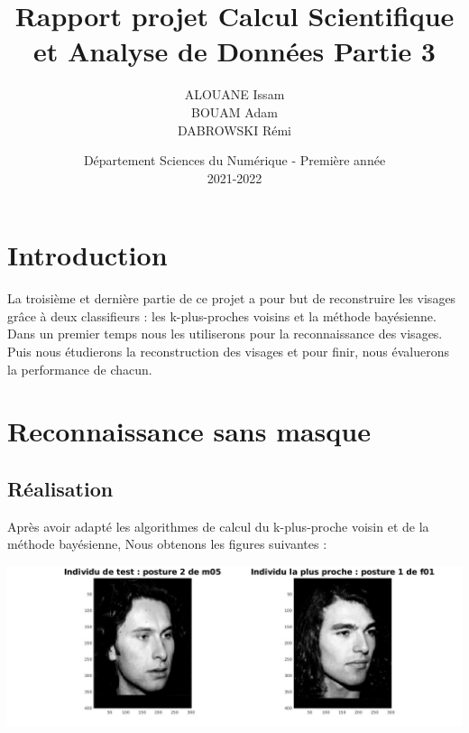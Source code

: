 \documentclass[frenchb]{article}
\begin{document}
	
	\begin{figure}[t]
		\centering
	\end{figure}
	
	\title{\vspace{4cm} \textbf{Rapport projet Calcul Scientifique et Analyse de Données Partie 3}}
	\author{ALOUANE Issam\\ BOUAM Adam\\ DABROWSKI Rémi\\ }
	\date{\vspace{9cm} Département Sciences du Numérique - Première année \\
		2021-2022 }
	
	\maketitle
	
	\newpage
	\tableofcontents
	\listoffigures
	
	\newpage
	\section{Introduction}{
	La troisième et dernière partie de ce projet a pour but de reconstruire les visages grâce à deux classifieurs : les k-plus-proches voisins et la méthode bayésienne. Dans un premier temps nous les utiliserons pour la reconnaissance des visages. Puis nous étudierons la reconstruction des visages et pour finir, nous évaluerons la performance de chacun.
	
	}
	
	\section{Reconnaissance sans masque}{
		
		
	}
	\subsection{Réalisation}
	Après avoir adapté les algorithmes de calcul du k-plus-proche voisin et de la méthode bayésienne, 
	Nous obtenons les figures suivantes :
	
		\includegraphics[scale=.2]{1.jpg}
		
\end{document}
